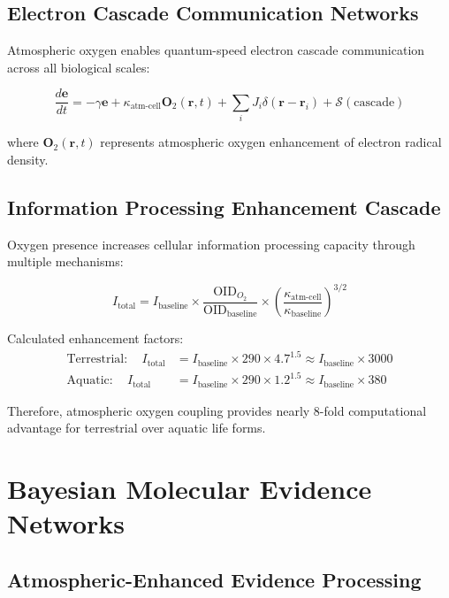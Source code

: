 \documentclass[twocolumn]{article}
\begin{document}
\subsection{Electron Cascade Communication Networks}

Atmospheric oxygen enables quantum-speed electron cascade communication across all biological scales:

\begin{equation}
\frac{d\mathbf{e}}{dt} = -\gamma \mathbf{e} + \kappa_{\text{atm-cell}} \mathbf{O}_2(\mathbf{r}, t) + \sum_i J_i \delta(\mathbf{r} - \mathbf{r}_i) + \mathcal{S}(\text{cascade})
\end{equation}

where $\mathbf{O}_2(\mathbf{r}, t)$ represents atmospheric oxygen enhancement of electron radical density.

\subsection{Information Processing Enhancement Cascade}

Oxygen presence increases cellular information processing capacity through multiple mechanisms:

\begin{equation}
I_{\text{total}} = I_{\text{baseline}} \times \frac{\text{OID}_{O_2}}{\text{OID}_{\text{baseline}}} \times \left(\frac{\kappa_{\text{atm-cell}}}{\kappa_{\text{baseline}}}\right)^{3/2}
\end{equation}

Calculated enhancement factors:
\begin{align}
\text{Terrestrial}: \quad I_{\text{total}} &= I_{\text{baseline}} \times 290 \times 4.7^{1.5} \approx I_{\text{baseline}} \times 3000 \\
\text{Aquatic}: \quad I_{\text{total}} &= I_{\text{baseline}} \times 290 \times 1.2^{1.5} \approx I_{\text{baseline}} \times 380
\end{align}

Therefore, atmospheric oxygen coupling provides nearly 8-fold computational advantage for terrestrial over aquatic life forms.

\section{Bayesian Molecular Evidence Networks}

\subsection{Atmospheric-Enhanced Evidence Processing}
\end{document}
